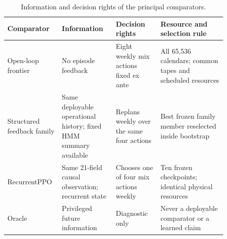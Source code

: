 \begin{table}[htbp]
\centering
\small
\caption{Information and decision rights of the principal comparators.}
\label{tab:comparators}
\begin{tabular}{p{0.18\linewidth}p{0.23\linewidth}p{0.19\linewidth}p{0.28\linewidth}}
\toprule
Comparator & Information & Decision rights & Resource and selection rule \\
\midrule
Open-loop frontier & No episode feedback & Eight weekly mix actions fixed ex ante & All 65,536 calendars; common tapes and scheduled resources \\
Structured feedback family & Same deployable operational history; fixed HMM summary available & Replans weekly over the same four actions & Best frozen family member reselected inside bootstrap \\
RecurrentPPO & Same 21-field causal observation; recurrent state & Chooses one of four mix actions weekly & Ten frozen checkpoints; identical physical resources \\
Oracle & Privileged future information & Diagnostic only & Never a deployable comparator or a learned claim \\
\bottomrule
\end{tabular}
\end{table}
